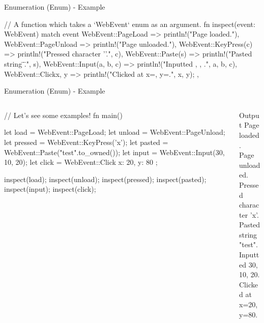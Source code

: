 \documentclass[10pt,xcolor={dvipsnames}, aspectratio=169]{beamer}
\begin{document}
    \begin{frame}[fragile]{Enumeration (Enum) - Example}
	    \begin{rustcode}
// A function which takes a `WebEvent` enum as an argument.
fn inspect(event: WebEvent) {
    match event {
        WebEvent::PageLoad => println!("Page loaded."),
        WebEvent::PageUnload => println!("Page unloaded."),
        WebEvent::KeyPress(c) => println!("Pressed character '{}'.", c),
        WebEvent::Paste(s) => println!("Pasted string \"{}\".", s),
        WebEvent::Input(a, b, c) => println!("Inputted {}, {}, {}.", a, b, c),
        WebEvent::Click{x, y} => { println!("Clicked at x={}, y={}.", x, y); },
    }
}
        \end{rustcode}
    \end{frame}
    \begin{frame}[fragile]{Enumeration (Enum) - Example}
	    \begin{columns}[T]
			\begin{column}{0.5 \textwidth}
                \begin{rustcode}
// Let's see some examples!
fn main() {
    let load = WebEvent::PageLoad;
    let unload = WebEvent::PageUnload;
    let pressed = WebEvent::KeyPress('x');
    let pasted = WebEvent::Paste("test".to_owned());
    let input = WebEvent::Input(30, 10, 20);
    let click = WebEvent::Click { x: 20, y: 80 };
    
    inspect(load);
    inspect(unload);
    inspect(pressed);
    inspect(pasted);
    inspect(input);
    inspect(click);
}
        \end{rustcode}
        \end{column}
        \begin{column}{0.5 \textwidth}
			\vspace{3cm}
			\begin{block}{Output}
				Page loaded. \\
				Page unloaded. \\
				Pressed character 'x'. \\
                Pasted string "test". \\
                Inputted 30, 10, 20. \\
                Clicked at x=20, y=80. \\
			\end{block}
		\end{column}
    \end{columns}
	\end{frame}
\end{document}
